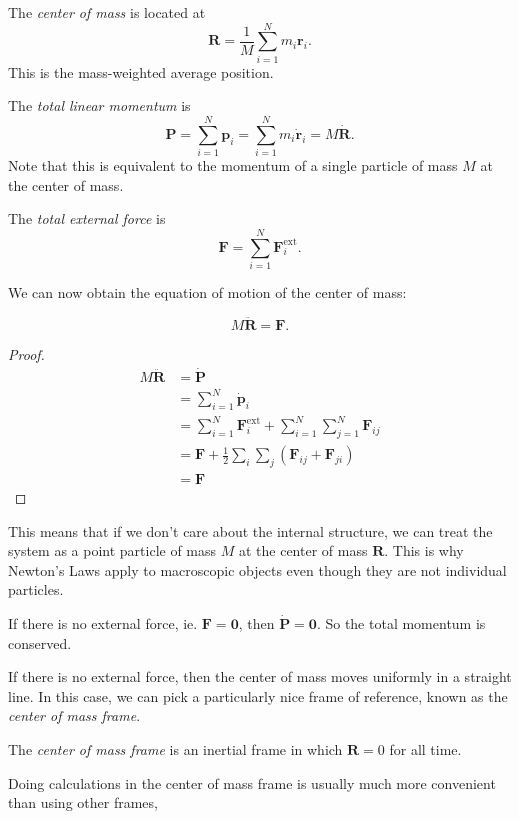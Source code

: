 \documentclass[a4paper]{article}
\begin{document}
\begin{defi}
  The \emph{center of mass} is located at
  \[
    \mathbf{R} = \frac{1}{M}\sum_{i = 1}^N m_i\mathbf{r}_i.
  \]
  This is the mass-weighted average position.
\end{defi}

\begin{defi}
  The \emph{total linear momentum} is
  \[
    \mathbf{P} = \sum_{i = 1}^N \mathbf{p}_i = \sum_{i = 1}^N m_i \dot{\mathbf{r}}_i = M\dot{\mathbf{R}}.
  \]
  Note that this is equivalent to the momentum of a single particle of mass $M$ at the center of mass.
\end{defi}

\begin{defi}
  The \emph{total external force} is
  \[
    \mathbf{F} = \sum_{i = 1}^N \mathbf{F}_i^{\text{ext}}.
  \]
\end{defi}

We can now obtain the equation of motion of the center of mass:
\begin{prop}
  \[
    M\ddot{\mathbf{R}} = \mathbf{F}.
  \]
\end{prop}

\begin{proof}
  \begin{align*}
    M\ddot{\mathbf{R}} &= \dot{\mathbf{P}}\\
    &= \sum_{i = 1}^N \dot{\mathbf{p}}_i\\
    &= \sum_{i = 1}^N \mathbf{F}_i^{\text{ext}} + \sum_{i = 1}^N\sum_{j = 1}^N \mathbf{F}_{ij}\\
    &= \mathbf{F} + \frac{1}{2}\sum_i \sum_j(\mathbf{F}_{ij} + \mathbf{F}_{ji})\\
    &= \mathbf{F}
  \end{align*}
\end{proof}
This means that if we don't care about the internal structure, we can treat the system as a point particle of mass $M$ at the center of mass $\mathbf{R}$. This is why Newton's Laws apply to macroscopic objects even though they are not individual particles.

\begin{law}
  If there is no external force, ie. $\mathbf{F} = \mathbf{0}$, then $\dot{\mathbf{P}} = \mathbf{0}$. So the total momentum is conserved.
\end{law}

If there is no external force, then the center of mass moves uniformly in a straight line. In this case, we can pick a particularly nice frame of reference, known as the \emph{center of mass frame}.
\begin{defi}
  The \emph{center of mass frame} is an inertial frame in which $\mathbf{R} = 0$ for all time.
\end{defi}
Doing calculations in the center of mass frame is usually much more convenient than using other frames,
\end{document}
